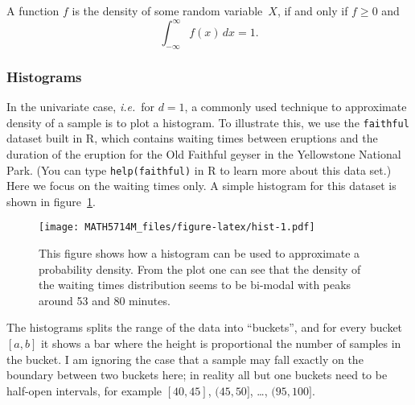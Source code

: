 \documentclass[
  a4paper,
]{article}
\newenvironment{Shaded}{\begin{snugshade}}{\end{snugshade}}
\newcommand{\AttributeTok}[1]{\textcolor[rgb]{0.77,0.63,0.00}{#1}}
\newcommand{\ConstantTok}[1]{\textcolor[rgb]{0.00,0.00,0.00}{#1}}
\newcommand{\FunctionTok}[1]{\textcolor[rgb]{0.00,0.00,0.00}{#1}}
\newcommand{\NormalTok}[1]{#1}
\newcommand{\OtherTok}[1]{\textcolor[rgb]{0.56,0.35,0.01}{#1}}
\newcommand{\SpecialCharTok}[1]{\textcolor[rgb]{0.00,0.00,0.00}{#1}}
\newcommand{\StringTok}[1]{\textcolor[rgb]{0.31,0.60,0.02}{#1}}
\theoremstyle{definition}
\theoremstyle{definition}
\theoremstyle{definition}
\theoremstyle{definition}
\theoremstyle{remark}
\begin{document}
A function \(f\) is the density of some random variable~\(X\),
if and only if \(f \geq 0\) and
\begin{equation*}
  \int_{-\infty}^\infty f(x) \,dx = 1.
\end{equation*}

\hypertarget{histograms-1}{%
\subsubsection{Histograms}\label{histograms-1}}

In the univariate case, \emph{i.e.}~for \(d = 1\), a commonly used technique
to approximate density of a sample is to plot a histogram. To
illustrate this, we use the \texttt{faithful} dataset built in R, which
contains waiting times between eruptions and the duration of the
eruption for the Old Faithful geyser in the Yellowstone National Park.
(You can type \texttt{help(faithful)} in R to learn more about this data
set.) Here we focus on the waiting times only. A simple histogram
for this dataset is shown in figure~\ref{fig:hist}.



\begin{Shaded}
\end{Shaded}

\begin{figure}
\centering
\texttt{[image: MATH5714M\_files/figure-latex/hist-1.pdf]}
\caption{\label{fig:hist}This figure shows how a histogram can be used to approximate a probability density. From the plot one can see that the density of the waiting times distribution seems to be bi-modal with peaks around 53 and 80 minutes.}
\end{figure}

The histograms splits the range of the data into ``buckets'', and for
every bucket \([a, b]\) it shows a bar where the height is proportional
the number of samples in the bucket. I am ignoring the case that a
sample may fall exactly on the boundary between two buckets here; in
reality all but one buckets need to be half-open intervals, for
example \([40, 45]\), \((45, 50]\), \ldots, \((95, 100]\).
\end{document}

